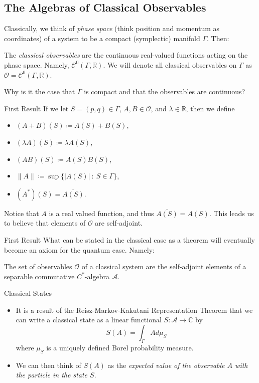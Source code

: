 \documentclass[pdf]{beamer}
\theoremstyle{definition}
\theoremstyle{theorem}
\newcommand{\R}{\mathbb{R}}
\newcommand{\A}{\mathcal{A}}
\newcommand{\C}{\mathbb{C}}
\newcommand{\opO}{\mathcal{O}}
\begin{document}
\subsection{The Algebras of Classical Observables}
	\begin{frame}
	Classically, we think of \emph{phase space} (think position and momentum as coordinates) of a system to be a compact (symplectic) manifold $\Gamma$. Then:
	\begin{definition}
	The \emph{classical observables} are the continuous real-valued functions acting on the phase space. Namely, $\mathcal{C}^0(\Gamma,\R)$. We will denote all classical observables on $\Gamma$ as $\mathcal{O}=\mathcal{C}^0(\Gamma,\R)$.
	\end{definition}
	Why is it the case that $\Gamma$ is compact and that the observables are continuous?
	\end{frame}
	
	\begin{frame}{First Result}
	If we let $S=(p,q)\in \Gamma$, $A,B\in \opO$, and $\lambda \in \R$, then we define
	\begin{itemize}
	\item $(A+B)(S) \coloneqq A(S)+B(S)$,
	\item $(\lambda A)(S) \coloneqq \lambda A(S)$,
	\item $(AB)(S)\coloneqq A(S)B(S)$,
	\item $\|A\|\coloneqq \sup \{|A(S)| ~\colon~ S\in \Gamma\}$,
	\item $(A^*)(S)=\overline{A(S)}$.
	\end{itemize}
	Notice that $A$ is a real valued function, and thus $\overline{A(S)}=A(S)$.  This leads us to believe that elements of $\opO$ are self-adjoint. 
	\end{frame}
	
	\begin{frame}{First Result}
	What can be stated in the classical case as a theorem will eventually become an axiom for the quantum case. Namely:
	\begin{theorem}
	The set of observables $\opO$ of a classical system are the self-adjoint elements of a separable commutative $C^*$-algebra $\A$.
	\end{theorem}
	\end{frame}
	
	\begin{frame}{Classical States}
	\begin{itemize}
	\item It is a result of the Reisz-Markov-Kakutani Representation Theorem that we can write a classical state as a linear functional $S\colon \A \to \C$ by
	\[
	S(A)=\int_\Gamma A d\mu_S
	\]
	where $\mu_S$ is a uniquely defined Borel probability measure. 
	\item We can then think of $S(A)$ as the \emph{expected value of the observable $A$ with the particle in the state $S$}.  
	\end{itemize}
	\end{frame}
\end{document}
